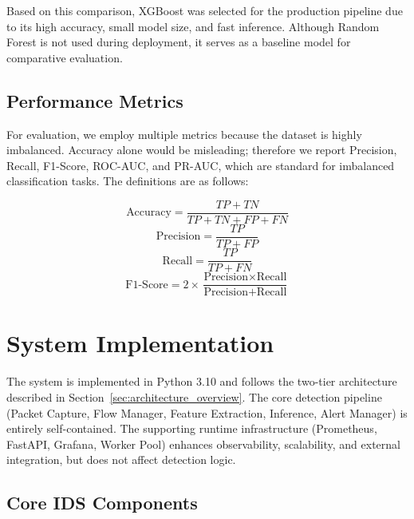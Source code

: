 \documentclass[12pt,a4paper]{article}
\begin{document}
Based on this comparison, XGBoost was selected for the production pipeline due to its high accuracy, small model size, and fast inference. Although Random Forest is not used during deployment, it serves as a baseline model for comparative evaluation.

\subsection{Performance Metrics}

For evaluation, we employ multiple metrics because the dataset is highly imbalanced. Accuracy alone would be misleading; therefore we report Precision, Recall, F1-Score, ROC-AUC, and PR-AUC, which are standard for imbalanced classification tasks. The definitions are as follows:

\begin{equation}
\text{Accuracy} = \frac{TP + TN}{TP + TN + FP + FN}
\end{equation}
\begin{equation}
\text{Precision} = \frac{TP}{TP + FP}
\end{equation}
\begin{equation}
\text{Recall} = \frac{TP}{TP + FN}
\end{equation}
\begin{equation}
\text{F1-Score} = 2 \times \frac{\text{Precision} \times \text{Recall}}{\text{Precision} + \text{Recall}}
\end{equation}

\section{System Implementation}

The system is implemented in Python 3.10 and follows the two-tier architecture described in Section~\ref{sec:architecture_overview}. The core detection pipeline (Packet Capture, Flow Manager, Feature Extraction, Inference, Alert Manager) is entirely self-contained. The supporting runtime infrastructure (Prometheus, FastAPI, Grafana, Worker Pool) enhances observability, scalability, and external integration, but does not affect detection logic.

\subsection{Core IDS Components}
\end{document}

